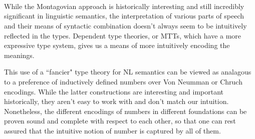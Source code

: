 \begin{code}%
\>[0]\AgdaSpace{}%
\AgdaSymbol{:}\AgdaSpace{}%
\AgdaSpace{}%
\AgdaSpace{}%
\<%
\\
\>[0]\AgdaSpace{}%
\AgdaSymbol{(}\AgdaSpace{}%
\AgdaOperator{\AgdaInductiveConstructor{,}}\AgdaSpace{}%
\AgdaSpace{}%
\AgdaOperator{\AgdaInductiveConstructor{,}}\AgdaSpace{}%
\AgdaSpace{}%
\AgdaSymbol{)}\AgdaSpace{}%
\AgdaSymbol{=}\AgdaSpace{}%
\AgdaSpace{}%
\AgdaOperator{\AgdaInductiveConstructor{,}}\AgdaSpace{}%
\AgdaSpace{}%
\AgdaOperator{\AgdaInductiveConstructor{,}}\AgdaSpace{}%
\AgdaSpace{}%
\AgdaOperator{\AgdaInductiveConstructor{,}}\AgdaSpace{}%
\AgdaSpace{}%
\AgdaOperator{\AgdaInductiveConstructor{,}}\AgdaSpace{}%
\<%
\\
\>[0]\AgdaSpace{}%
\AgdaSymbol{:}\AgdaSpace{}%
\AgdaSpace{}%
\AgdaSpace{}%
\<%
\\
\>[0]\AgdaSpace{}%
\AgdaSymbol{(}\AgdaSpace{}%
\AgdaOperator{\AgdaInductiveConstructor{,}}\AgdaSpace{}%
\AgdaSpace{}%
\AgdaOperator{\AgdaInductiveConstructor{,}}\AgdaSpace{}%
\AgdaSpace{}%
\AgdaSymbol{)}\AgdaSpace{}%
\AgdaSymbol{=}\AgdaSpace{}%
\AgdaSpace{}%
\AgdaOperator{\AgdaInductiveConstructor{,}}\AgdaSpace{}%
\AgdaSpace{}%
\AgdaOperator{\AgdaInductiveConstructor{,}}\AgdaSpace{}%
\AgdaSpace{}%
\AgdaOperator{\AgdaInductiveConstructor{,}}\AgdaSpace{}%
\AgdaSpace{}%
\AgdaOperator{\AgdaInductiveConstructor{,}}\AgdaSpace{}%
\<%
\end{code}

While the Montagovian approach is historically interesting and still incredibly
significant in linguistic semantics, the interpretation of various parts of
speech and their means of syntactic combination doesn't always seem to be intuitively reflected in the types. Dependent type theories, or MTTs, which have a more expressive type system, gives us a means of more intuitively encoding the meanings.

This use of a ``fancier" type theory for NL semantics can be viewed as analagous
to a preference of inductively defined numbers over Von Neumman or Chruch
encodings. While the latter constructions are interesting and important
historically, they aren't easy to work with and don't match our intuition.
Nonetheless, the different encodings of numbers in different foundations can be
proven sound and complete with respect to each other, so that one can rest
assured that the intuitive notion of number is captured by all of them.

